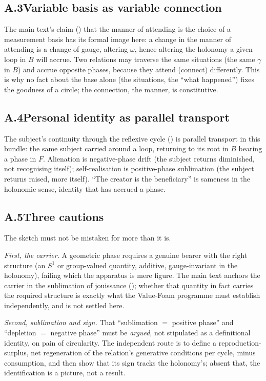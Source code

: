 \subsection*{A.3\quad Variable basis as variable connection}
The main text's claim () that the manner of attending is the choice of a measurement basis has its formal image here: a change in the manner of attending is a change of gauge, altering $\omega$, hence altering the holonomy a given loop in $B$ will accrue. Two relations may traverse the same situations (the same $\gamma$ in $B$) and accrue opposite phases, because they attend (connect) differently. This is why no fact about the base alone (the situations, the ``what happened'') fixes the goodness of a circle; the connection, the manner, is constitutive.

\subsection*{A.4\quad Personal identity as parallel transport}
The subject's continuity through the reflexive cycle () is parallel transport in this bundle: the same subject carried around a loop, returning to its root in $B$ bearing a phase in $F$. Alienation is negative-phase drift (the subject returns diminished, not recognising itself); self-realisation is positive-phase sublimation (the subject returns raised, more itself). ``The creator is the beneficiary'' is sameness in the holonomic sense, identity that has accrued a phase.

\subsection*{A.5\quad Three cautions}
The sketch must not be mistaken for more than it is.

\emph{First, the carrier.} A geometric phase requires a genuine bearer with the right structure (an $S^1$ or group-valued quantity, additive, gauge-invariant in the holonomy), failing which the apparatus is mere figure. The main text anchors the carrier in the sublimation of jouissance (); whether that quantity in fact carries the required structure is exactly what the Value-Foam programme must establish independently, and is not settled here.

\emph{Second, sublimation and sign.} That ``sublimation $=$ positive phase'' and ``depletion $=$ negative phase'' must be \emph{argued}, not stipulated as a definitional identity, on pain of circularity. The independent route is to define a reproduction-surplus, net regeneration of the relation's generative conditions per cycle, minus consumption, and then show that its sign tracks the holonomy's; absent that, the identification is a picture, not a result.

